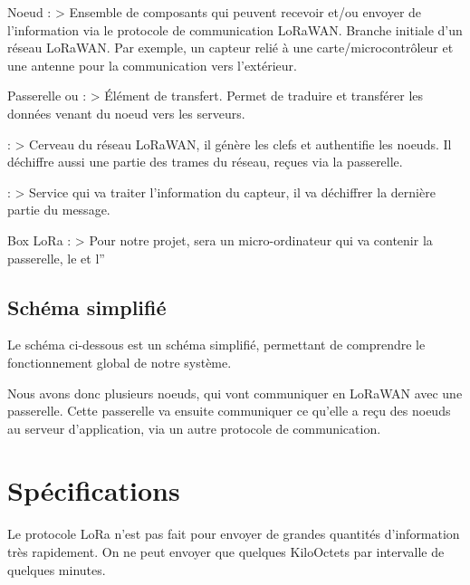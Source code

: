 \documentclass[letterpaper,10pt,french]{sphinxmanual}
\let\sphinxpxdimen\pdfpxdimen\else\newdimen\sphinxpxdimen
\begin{document}
Noeud :
\textgreater{} Ensemble de composants qui peuvent recevoir et/ou envoyer de l’information via le protocole de communication LoRaWAN. Branche initiale d’un réseau LoRaWAN. Par exemple, un capteur relié à une carte/microcontrôleur et une antenne pour la communication vers l’extérieur.

Passerelle ou  :
\textgreater{} Élément de transfert. Permet de traduire et transférer les données venant du noeud vers les serveurs.

 :
\textgreater{} Cerveau du réseau LoRaWAN, il génère les clefs et authentifie les noeuds. Il déchiffre aussi une partie des trames du réseau, reçues via la passerelle.

 :
\textgreater{} Service qui va traiter l’information du capteur, il va déchiffrer la dernière partie du message.

Box LoRa :
\textgreater{} Pour notre projet, sera un micro-ordinateur  qui va contenir la passerelle, le  et l”


\section{Schéma simplifié}
\label{\detokenize{introduction:schema-simplifie}}
Le schéma ci-dessous est un schéma simplifié, permettant de comprendre le fonctionnement global de notre système.

Nous avons donc plusieurs noeuds, qui vont communiquer en LoRaWAN avec une passerelle. Cette passerelle va ensuite communiquer ce qu’elle a reçu des noeuds au serveur d’application, via un autre protocole de communication.

\noindent\sphinxincludegraphics[width=800\sphinxpxdimen]{{Schema_LoRaWAN}.png}


\chapter{Spécifications}
\label{\detokenize{specifications:specifications}}\label{\detokenize{specifications::doc}}
Le protocole LoRa n’est pas fait pour envoyer de grandes quantités d’information très rapidement. On ne peut envoyer que quelques KiloOctets par intervalle de quelques minutes.
\end{document}
